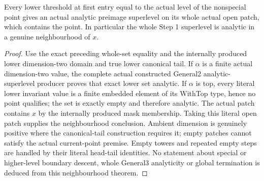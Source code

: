 \begin{theorem}
\label{hir:dimension-three-nonspecial-local-analytic-superlevels}
\leanok
Every lower threshold at first entry equal to the actual level of the
nonspecial point gives an actual analytic preimage superlevel on its
whole actual open patch, which contains the point. In particular the
whole Step 1 superlevel is analytic in a genuine neighbourhood of $x$.
\end{theorem}
\begin{proof}
Use the exact preceding whole-set equality and the internally produced
lower dimension-two domain and true lower canonical tail. If $\alpha$
is a finite actual dimension-two value, the complete actual constructed
General2 analytic-superlevel producer proves that exact lower set
analytic. If $\alpha$ is top, every literal lower invariant value is a
finite embedded element of its WithTop type, hence no point qualifies;
the set is exactly empty and therefore analytic. The actual patch
contains $x$ by the internally produced mask membership. Taking this
literal open patch supplies the neighbourhood conclusion. Ambient
dimension is genuinely positive where the canonical-tail construction
requires it; empty patches cannot satisfy the actual current-point
premise. Empty towers and repeated empty steps are handled by their
literal head-tail identities. No statement about special or higher-level
boundary descent, whole General3 analyticity or global termination is
deduced from this neighbourhood theorem.
\end{proof}
